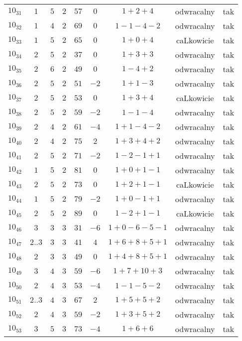 \begin{longtable}{ccccccccc}
$10_{31}$ & $1$ & $5$ & $2$ & $57$ & $0$ & $1+2+4$ & odwracalny & tak \\
$10_{32}$ & $1$ & $4$ & $2$ & $69$ & $0$ & $1-1-4-2$ & odwracalny & tak \\
$10_{33}$ & $1$ & $5$ & $2$ & $65$ & $0$ & $1+0+4$ & caLkowicie & tak \\
$10_{34}$ & $2$ & $5$ & $2$ & $37$ & $0$ & $1+3+3$ & odwracalny & tak \\
$10_{35}$ & $2$ & $6$ & $2$ & $49$ & $0$ & $1-4+2$ & odwracalny & tak \\
$10_{36}$ & $2$ & $5$ & $2$ & $51$ & $-2$ & $1+1-3$ & odwracalny & tak \\
$10_{37}$ & $2$ & $5$ & $2$ & $53$ & $0$ & $1+3+4$ & caLkowicie & tak \\
$10_{38}$ & $2$ & $5$ & $2$ & $59$ & $-2$ & $1-1-4$ & odwracalny & tak \\
$10_{39}$ & $2$ & $4$ & $2$ & $61$ & $-4$ & $1+1-4-2$ & odwracalny & tak \\
$10_{40}$ & $2$ & $4$ & $2$ & $75$ & $2$ & $1+3+4+2$ & odwracalny & tak \\
$10_{41}$ & $2$ & $5$ & $2$ & $71$ & $-2$ & $1-2-1+1$ & odwracalny & tak \\
$10_{42}$ & $1$ & $5$ & $2$ & $81$ & $0$ & $1+0+1-1$ & odwracalny & tak \\
$10_{43}$ & $2$ & $5$ & $2$ & $73$ & $0$ & $1+2+1-1$ & caLkowicie & tak \\
$10_{44}$ & $1$ & $5$ & $2$ & $79$ & $-2$ & $1+0-1+1$ & odwracalny & tak \\
$10_{45}$ & $2$ & $5$ & $2$ & $89$ & $0$ & $1-2+1-1$ & caLkowicie & tak \\
$10_{46}$ & $3$ & $3$ & $3$ & $31$ & $-6$ & $1+0-6-5-1$ & odwracalny & tak \\
$10_{47}$ & $2..3$ & $3$ & $3$ & $41$ & $4$ & $1+6+8+5+1$ & odwracalny & tak \\
$10_{48}$ & $2$ & $3$ & $3$ & $49$ & $0$ & $1+4+8+5+1$ & odwracalny & tak \\
$10_{49}$ & $3$ & $4$ & $3$ & $59$ & $-6$ & $1+7+10+3$ & odwracalny & tak \\
$10_{50}$ & $2$ & $4$ & $3$ & $53$ & $-4$ & $1-1-5-2$ & odwracalny & tak \\
$10_{51}$ & $2..3$ & $4$ & $3$ & $67$ & $2$ & $1+5+5+2$ & odwracalny & tak \\
$10_{52}$ & $2$ & $4$ & $3$ & $59$ & $-2$ & $1+3+5+2$ & odwracalny & tak \\
$10_{53}$ & $3$ & $5$ & $3$ & $73$ & $-4$ & $1+6+6$ & odwracalny & tak \\

\end{longtable}

